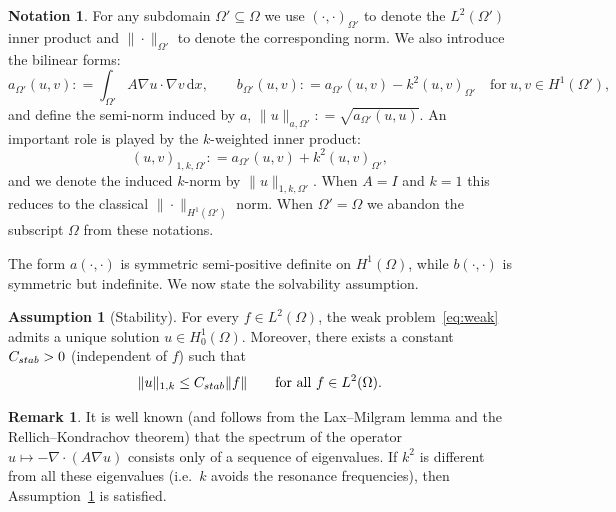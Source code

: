 \documentclass[preprint,3p,times]{elsarticle}
\newcommand{\assign}{\mathrel{\mathop:}=}
\newcommand{\rd}{\mathrm{d}}
\newcommand{\Cstab}{C_{\textup{\textsf{stab}}}}
\theoremstyle{definition}
\newtheorem{assumption}[theorem]{Assumption}
\newtheorem{remark}[theorem]{Remark}
\newtheorem{notation}[theorem]{Notation}
\numberwithin{equation}{section}
\begin{document}
\begin{notation}
\label{not:forms}
For any subdomain $\Omega' \subseteq \Omega$ we use  $(\cdot,\cdot)_{\Omega'}$ to denote the $L^2(\Omega')$ inner product and $\|\cdot\|_{\Omega'}$ to denote the corresponding norm.
We also introduce the bilinear forms:
\begin{equation}
	a_{\Omega'}(u,v) \assign \int_{\Omega'} A\nabla u \cdot \nabla v \,\rd x, \qquad
	b_{\Omega'}(u,v) \assign a_{\Omega'}(u,v) - k^2(u,v)_{\Omega'}
	\quad\text{for} \ u,v\in H^1(\Omega'),
    \label{eq:2.18}
\end{equation}
and define the semi-norm induced by $a$, $\|u\|_{a,\Omega'} \assign \sqrt{a_{\Omega'}(u,u)}$. 
An important role is played by the $k$-weighted inner product:
\begin{equation*}
    (u,v)_{1, k,\Omega'} \assign a_{\Omega'}(u,v) + k^2 (u,v)_{\Omega'},
\end{equation*}
and we denote the induced $k$-norm by $\|u\|_{1, k, \Omega'}$. {When $A=I$ and $k=1$ this reduces to the classical $\|\cdot\|_{H^1(\Omega')}$ norm.}
When $\Omega'= \Omega$ we abandon the subscript $\Omega$ from these notations. 
\end{notation}

The form $a(\cdot,\cdot)$ is symmetric semi-positive definite on $H^1(\Omega)$, while $b(\cdot,\cdot)$ is symmetric but indefinite. 
We now state the solvability assumption.

\begin{assumption}[Stability]\label{ass:stab}
For every $f\in L^2(\Omega)$, the weak problem~\eqref{eq:weak} admits a unique solution $u\in H^1_0(\Omega)$. 
Moreover, there exists a constant $\Cstab>0$ \textup{(}independent of $f$\textup{)} such that
\begin{equation}\label{eq:stab_bound}
	\|u\|_{1,k}  \le \Cstab \|f\| \qquad \text{for all} \ f\in L^2(\Omega).
\end{equation}
\end{assumption}

{\begin{remark}
It is well known (and follows from the Lax--Milgram lemma and the Rellich--Kondrachov theorem) that the spectrum of 
the operator $u\mapsto -\nabla\cdot(A\nabla u)$ consists only of a sequence of eigenvalues.
If $k^2$ is different from all these eigenvalues (i.e.\ $k$ avoids the resonance frequencies), then Assumption~\ref{ass:stab} is satisfied.
\end{remark}
}
\end{document}
